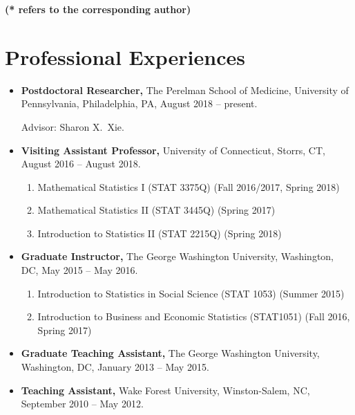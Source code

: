 \documentclass[margin]{res}
\begin{document}
\begin{resume}
{\bf (* refers to the corresponding author)}

\section{Professional Experiences}
\begin{itemize}
	\item {\bf Postdoctoral Researcher,} The Perelman School of 
	Medicine, University of Pennsylvania, Philadelphia, PA, August 
	2018 -- present.
	
	Advisor: Sharon X.\ Xie.
	\item {\bf Visiting Assistant Professor,} University of Connecticut, Storrs, CT, August 2016 -- August 2018.
	\begin{enumerate}
		\item Mathematical Statistics {\rm I} (STAT 3375Q) (Fall 2016/2017, Spring 2018)
		\item Mathematical Statistics {\rm II} (STAT 3445Q) (Spring 2017)
		\item Introduction to Statistics {\rm II} (STAT 2215Q) (Spring 2018)
	\end{enumerate}
	
	\item {\bf Graduate Instructor,} The George Washington University, Washington, DC, May 2015 -- May 2016.
	\begin{enumerate}
		\item Introduction to Statistics in Social Science (STAT 1053) (Summer 2015)
		\item Introduction to Business and Economic Statistics (STAT1051) (Fall 2016, Spring 2017)
	\end{enumerate}
	
	\item{\bf Graduate Teaching Assistant,} The George Washington University, Washington, DC, January 2013 -- May 2015.
	
	\item{\bf Teaching Assistant,} Wake Forest University, Winston-Salem, NC, September 2010 -- May 2012.
\end{itemize}


\end{resume}
\end{document}
